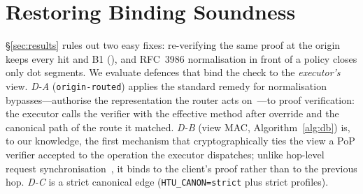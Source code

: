 \section{Restoring Binding Soundness}\label{sec:defence}

\S\ref{sec:results} rules out two easy fixes: re-verifying the same proof at
the origin keeps every \GA hit and B1 (), and RFC~3986 normalisation in
front of a policy closes only dot segments. We evaluate defences that bind the
check to the \emph{executor's} view.
\emph{D-A} (\texttt{origin-routed}) applies the standard remedy for
normalisation bypasses---authorise the representation the router acts
on~\cite{p2:spring2016_5007,p2:zhang2025uabscan,p2:apisix2026_124680}---to
proof verification: the executor calls the verifier with the effective method
after override and the canonical path of the route it matched.
\emph{D-B} (view MAC, Algorithm~\ref{alg:db}) is, to our knowledge, the first
mechanism that cryptographically ties the view a PoP verifier accepted to the
operation the executor dispatches; unlike hop-level request
synchronisation~\cite{topcuoglu2025sync}, it binds to the client's proof rather
than to the previous hop. \emph{D-C} is a strict canonical edge
(\texttt{HTU\_CANON=strict} plus strict profiles).

\begin{algorithm}[t]
\caption{D-B: verifier emits, executor recomputes the view MAC
with $\mathsf{mac}(\pi,m,p)=\mathrm{HMAC}_K(\pi.\jti\,\|\,\mathrm{upper}(m)\,\|\,p\,\|\,\mathsf{th}(\pi.\mathit{jwk}))$, key $K$ shared by verifier and executor, $\|$ a newline.}\label{alg:db}
\end{algorithm}

